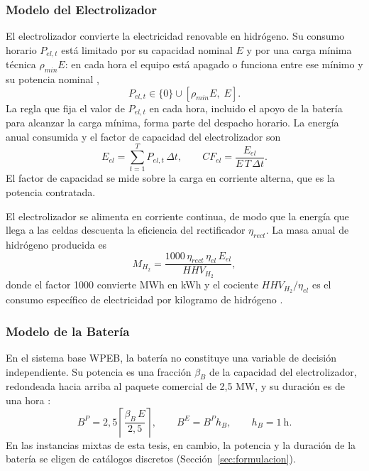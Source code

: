 \subsubsection{Modelo del Electrolizador}

El electrolizador convierte la electricidad renovable en hidrógeno. Su consumo horario $P_{el,t}$ está limitado por su capacidad nominal $E$ y por una carga mínima técnica $\rho_{min}E$: en cada hora el equipo está apagado o funciona entre ese mínimo y su potencia nominal \cite{Li2024WPEB,Khan2022Review},
\begin{equation}
P_{el,t}\in\{0\}\cup\left[\rho_{min}E,\;E\right].
\end{equation}
La regla que fija el valor de $P_{el,t}$ en cada hora, incluido el apoyo de la batería para alcanzar la carga mínima, forma parte del despacho horario. La energía anual consumida y el factor de capacidad del electrolizador son
\begin{equation}
E_{el}=\sum_{t=1}^{T}P_{el,t}\,\Delta t,\qquad
CF_{el}=\frac{E_{el}}{E\,T\,\Delta t}.
\end{equation}
El factor de capacidad se mide sobre la carga en corriente alterna, que es la potencia contratada.

El electrolizador se alimenta en corriente continua, de modo que la energía que llega a las celdas descuenta la eficiencia del rectificador $\eta_{rect}$. La masa anual de hidrógeno producida es
\begin{equation}
M_{H_2}=\frac{1000\,\eta_{rect}\,\eta_{el}\,E_{el}}{HHV_{H_2}},
\end{equation}
donde el factor 1000 convierte MWh en kWh y el cociente $HHV_{H_2}/\eta_{el}$ es el consumo específico de electricidad por kilogramo de hidrógeno \cite{Li2024WPEB}.

\subsubsection{Modelo de la Batería}

En el sistema base WPEB, la batería no constituye una variable de decisión independiente. Su potencia es una fracción $\beta_B$ de la capacidad del electrolizador, redondeada hacia arriba al paquete comercial de 2,5 MW, y su duración es de una hora \cite{Li2024WPEB}:
\begin{equation}
B^{P}=2{,}5\left\lceil\frac{\beta_B\,E}{2{,}5}\right\rceil,\qquad
B^{E}=B^{P}h_B,\qquad
h_B=1\ \text{h}.
\end{equation}
En las instancias mixtas de esta tesis, en cambio, la potencia y la duración de la batería se eligen de catálogos discretos (Sección~\ref{sec:formulacion}).

